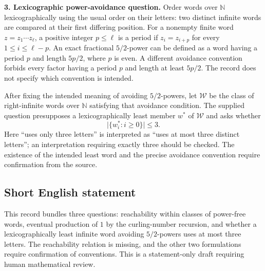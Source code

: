 \documentclass[11pt]{article}
\begin{document}
\textbf{3. Lexicographic power-avoidance question.} Order words over $\mathbb N$ lexicographically using the usual order on their letters: two distinct infinite words are compared at their first differing position. For a nonempty finite word $z=z_1\cdots z_\ell$, a positive integer $p\leq\ell$ is a period if $z_i=z_{i+p}$ for every $1\leq i\leq\ell-p$. An exact fractional $5/2$-power can be defined as a word having a period $p$ and length $5p/2$, where $p$ is even. A different avoidance convention forbids every factor having a period $p$ and length at least $5p/2$. The record does not specify which convention is intended.

After fixing the intended meaning of avoiding $5/2$-powers, let $\mathcal W$ be the class of right-infinite words over $\mathbb N$ satisfying that avoidance condition. The supplied question presupposes a lexicographically least member $w^*$ of $\mathcal W$ and asks whether
\[
\bigl|\{w_i^*:i\geq 0\}\bigr|\leq 3.
\]
Here ``uses only three letters'' is interpreted as ``uses at most three distinct letters''; an interpretation requiring exactly three should be checked. The existence of the intended least word and the precise avoidance convention require confirmation from the source.
\subsection{Short English statement}
This record bundles three questions: reachability within classes of power-free words, eventual production of $1$ by the curling-number recursion, and whether a lexicographically least infinite word avoiding $5/2$-powers uses at most three letters. The reachability relation is missing, and the other two formulations require confirmation of conventions. This is a statement-only draft requiring human mathematical review.
\end{document}
